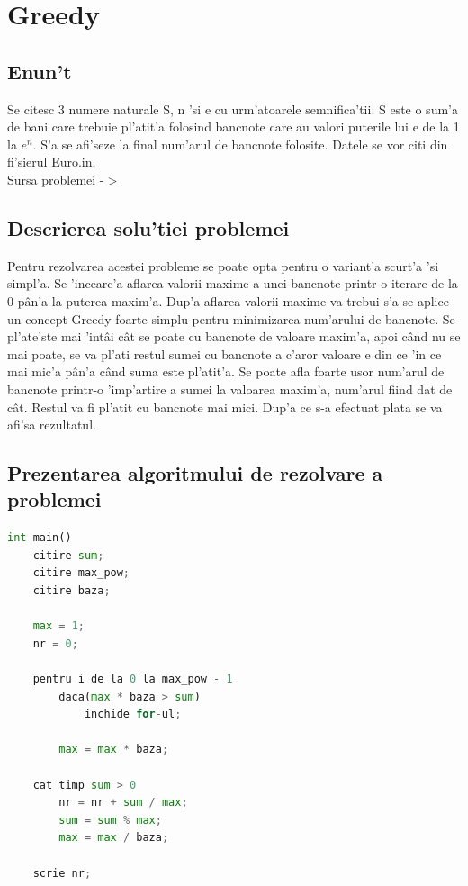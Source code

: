 \chapter{Greedy}
\section{Enun't}
\myindent
Se citesc 3 numere naturale S, n 'si e cu urm'atoarele semnifica'tii: S este o sum'a de bani care trebuie pl'atit'a folosind bancnote care au valori puterile lui e de la 1 la $e^{n}$. S'a se afi'seze la final num'arul de bancnote folosite. Datele se vor citi din fi'sierul Euro.in.\\

Sursa problemei -$>$ \cite{Greedy}
\vspace{5mm}
\section{Descrierea solu'tiei problemei}
\myindent
Pentru rezolvarea acestei probleme se poate opta pentru o variant'a scurt'a 'si simpl'a. Se 'incearc'a aflarea valorii maxime a unei bancnote printr-o iterare de la 0 p\^an'a la puterea maxim'a. Dup'a aflarea valorii maxime va trebui s'a se aplice un concept Greedy foarte simplu pentru minimizarea num'arului de bancnote. Se pl'ate'ste mai 'int\^ai c\^at se poate cu bancnote de valoare maxim'a, apoi c\^and nu se mai poate, se va pl'ati restul sumei cu bancnote a c'aror valoare e din ce 'in ce mai mic'a p\^an'a c\^and suma este pl'atit'a. Se poate afla foarte usor num'arul de bancnote printr-o 'imp'artire a sumei la valoarea maxim'a, num'arul fiind dat de c\^at. Restul va fi pl'atit cu bancnote mai mici. Dup'a ce s-a efectuat plata se va afi'sa rezultatul.

\newpage
\section{Prezentarea algoritmului de rezolvare a problemei}
\begin{lstlisting}[language=Python]
int main()
	citire sum;
	citire max_pow;
	citire baza;

	max = 1;
	nr = 0;

	pentru i de la 0 la max_pow - 1
		daca(max * baza > sum)
			inchide for-ul;

		max = max * baza;

	cat timp sum > 0
		nr = nr + sum / max;
		sum = sum % max;
		max = max / baza;

	scrie nr;
\end{lstlisting}

